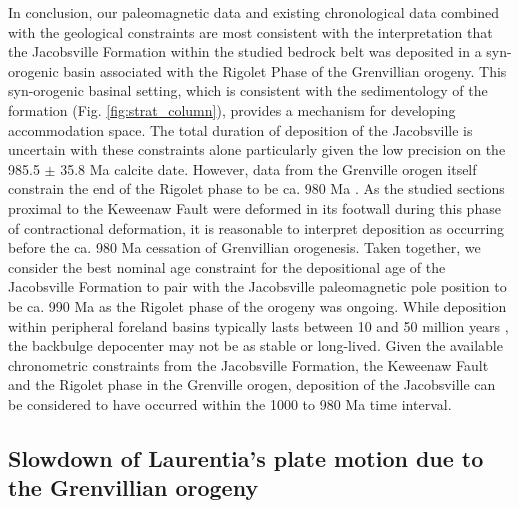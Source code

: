 In conclusion, our paleomagnetic data and existing chronological data combined with the geological constraints are most consistent with the interpretation that the Jacobsville Formation within the studied bedrock belt was deposited in a syn-orogenic basin associated with the Rigolet Phase of the Grenvillian orogeny. This syn-orogenic basinal setting, which is consistent with the sedimentology of the formation (Fig. \ref{fig:strat_column}), provides a mechanism for developing accommodation space. The total duration of deposition of the Jacobsville is uncertain with these constraints alone particularly given the low precision on the 985.5 $\pm$ 35.8 Ma calcite date. However, data from the Grenville orogen itself constrain the end of the Rigolet phase to be ca. 980 Ma \citep{Swanson-Hysell2023a}. As the studied sections proximal to the Keweenaw Fault were deformed in its footwall during this phase of contractional deformation, it is reasonable to interpret deposition as occurring before the ca. 980 Ma cessation of Grenvillian orogenesis. Taken together, we consider the best nominal age constraint for the depositional age of the Jacobsville Formation to pair with the Jacobsville paleomagnetic pole position to be ca. 990 Ma as the Rigolet phase of the orogeny was ongoing. While deposition within peripheral foreland basins typically lasts between 10 and 50 million years \citep{Woodcock2004a}, the backbulge depocenter may not be as stable or long-lived. Given the available chronometric constraints from the Jacobsville Formation, the Keweenaw Fault and the Rigolet phase in the Grenville orogen, deposition of the Jacobsville can be considered to have occurred within the 1000 to 980 Ma time interval.

\subsection*{Slowdown of Laurentia's plate motion due to the Grenvillian orogeny}


